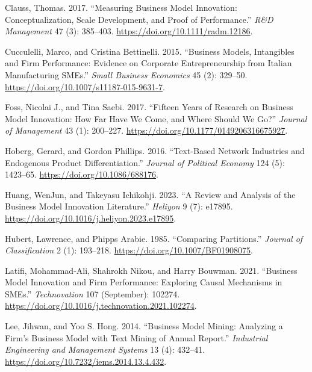 \documentclass[
]{article}
\newlength{\cslhangindent}
\newenvironment{CSLReferences}[2] %
 {\begin{list}{}{%
  \setlength{\itemindent}{0pt}
  \setlength{\leftmargin}{0pt}
  \setlength{\parsep}{0pt}
  \ifodd #1
   \setlength{\leftmargin}{\cslhangindent}
   \setlength{\itemindent}{-1\cslhangindent}
  \fi
  \setlength{\itemsep}{#2\baselineskip}}}
 {\end{list}}
\begin{document}
\label{refs}
\begin{CSLReferences}{1}{0}
Clauss, Thomas. 2017. {``Measuring Business Model Innovation:
Conceptualization, Scale Development, and Proof of Performance.''}
\emph{R\&D Management} 47 (3): 385--403.
\url{https://doi.org/10.1111/radm.12186}.

Cucculelli, Marco, and Cristina Bettinelli. 2015. {``Business Models,
Intangibles and Firm Performance: Evidence on Corporate Entrepreneurship
from {Italian} Manufacturing {SMEs}.''} \emph{Small Business Economics}
45 (2): 329--50. \url{https://doi.org/10.1007/s11187-015-9631-7}.

Foss, Nicolai J., and Tina Saebi. 2017. {``Fifteen {Years} of {Research}
on {Business} {Model} {Innovation}: {How} {Far} {Have} {We} {Come}, and
{Where} {Should} {We} {Go}?''} \emph{Journal of Management} 43 (1):
200--227. \url{https://doi.org/10.1177/0149206316675927}.

Hoberg, Gerard, and Gordon Phillips. 2016. {``Text-{Based} {Network}
{Industries} and {Endogenous} {Product} {Differentiation}.''}
\emph{Journal of Political Economy} 124 (5): 1423--65.
\url{https://doi.org/10.1086/688176}.

Huang, WenJun, and Takeyasu Ichikohji. 2023. {``A Review and Analysis of
the Business Model Innovation Literature.''} \emph{Heliyon} 9 (7):
e17895. \url{https://doi.org/10.1016/j.heliyon.2023.e17895}.

Hubert, Lawrence, and Phipps Arabie. 1985. {``Comparing Partitions.''}
\emph{Journal of Classification} 2 (1): 193--218.
\url{https://doi.org/10.1007/BF01908075}.

Latifi, Mohammad-Ali, Shahrokh Nikou, and Harry Bouwman. 2021.
{``Business Model Innovation and Firm Performance: {Exploring} Causal
Mechanisms in {SMEs}.''} \emph{Technovation} 107 (September): 102274.
\url{https://doi.org/10.1016/j.technovation.2021.102274}.

Lee, Jihwan, and Yoo S. Hong. 2014. {``Business {Model} {Mining}:
{Analyzing} a {Firm}'s {Business} {Model} with {Text} {Mining} of
{Annual} {Report}.''} \emph{Industrial Engineering and Management
Systems} 13 (4): 432--41.
\url{https://doi.org/10.7232/iems.2014.13.4.432}.


\end{CSLReferences}
\end{document}
